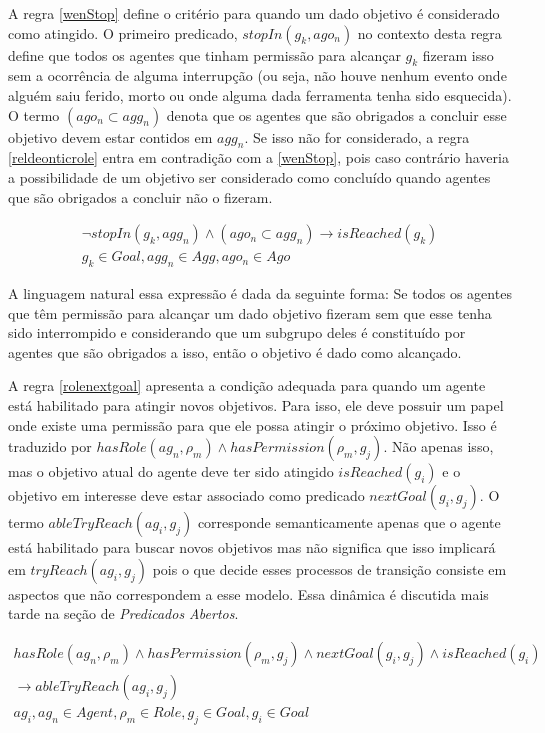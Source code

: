 A regra \ref{wenStop} define o critério para quando um dado objetivo é considerado como atingido. O primeiro predicado, $stopIn(g_k,ago_n)$ no contexto desta regra define que todos os agentes que tinham permissão para alcançar $g_k$ fizeram isso sem a ocorrência de alguma interrupção (ou seja, não houve nenhum evento onde alguém saiu ferido, morto ou onde alguma dada ferramenta tenha sido esquecida). O termo $(ago_n \subset agg_n)$ denota que os agentes que são obrigados a concluir esse objetivo devem estar contidos em $agg_n$. Se isso não for considerado, a regra \ref{reldeonticrole} entra em contradição com a \ref{wenStop}, pois caso contrário haveria a possibilidade de um objetivo ser considerado como concluído quando agentes que são obrigados a concluir não o fizeram. 

\begin{eqnarray}\label{wenStop}
	\neg stopIn(g_k,agg_n) \wedge (ago_n \subset agg_n) \to isReached(g_k) \nonumber \\ 
    g_k \in Goal, agg_n \in Agg, ago_n \in Ago 
\end{eqnarray}

A linguagem natural essa expressão é dada da seguinte forma: Se todos os agentes que têm permissão para alcançar um dado objetivo fizeram sem que esse tenha sido interrompido e considerando que um subgrupo deles é constituído por agentes que são obrigados a isso, então o objetivo é dado como alcançado.

A regra \ref{rolenextgoal} apresenta a condição adequada para quando um agente está habilitado para atingir novos objetivos. Para isso, ele deve possuir um papel onde existe uma permissão para que ele possa atingir o próximo objetivo. Isso é traduzido por $ hasRole(ag_n,\rho_m) \wedge hasPermission(\rho_m,g_j) $. Não apenas isso, mas o objetivo atual do agente deve ter sido atingido $ isReached(g_i) $ e o objetivo em interesse deve estar associado como predicado $nextGoal(g_i,g_j)$. O termo $ableTryReach(ag_i,g_j)$ corresponde semanticamente apenas que o agente está habilitado para buscar novos objetivos mas não significa que isso implicará em $tryReach(ag_i,g_j)$ pois o que decide esses processos de transição consiste em aspectos que não correspondem a esse modelo. Essa dinâmica é discutida mais tarde na seção de \textit{Predicados Abertos}.

\begin{eqnarray}\label{rolenextgoal}
	hasRole(ag_n,\rho_m) \wedge hasPermission(\rho_m,g_j) \wedge nextGoal(g_i,g_j) \wedge isReached(g_i) \nonumber \\
	\to ableTryReach(ag_i,g_j) \nonumber \\
    ag_i, ag_n \in Agent, \rho_m \in Role, g_j \in Goal, g_i \in Goal
\end{eqnarray}

